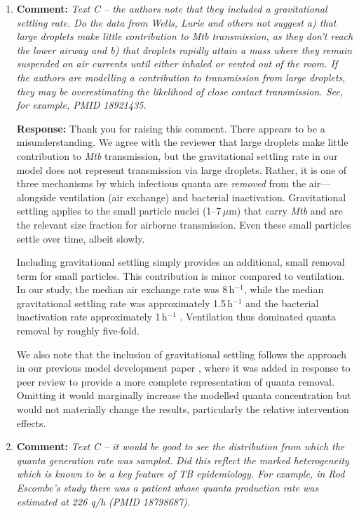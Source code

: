 \documentclass[11pt]{article}
\newcommand{\comment}[1]{\textbf{Comment:} \textit{#1}}
\newcommand{\response}[1]{\textbf{Response:} #1}
\begin{document}
\begin{enumerate}[label=\textbf{R2.\arabic*.}, leftmargin=*]
\item\label{r:2.22} \comment{Text C -- the authors note that they included a gravitational settling rate. Do the data from Wells, Lurie and others not suggest a) that large droplets make little contribution to Mtb transmission, as they don't reach the lower airway and b) that droplets rapidly attain a mass where they remain suspended on air currents until either inhaled or vented out of the room. If the authors are modelling a contribution to transmission from large droplets, they may be overestimating the likelihood of close contact transmission. See, for example, PMID 18921435.}

\response{Thank you for raising this comment. There appears to be a misunderstanding. We agree with the reviewer that large droplets make little contribution to \emph{Mtb} transmission, but the gravitational settling rate in our model does not represent transmission via large droplets. Rather, it is one of three mechanisms by which infectious quanta are \textit{removed} from the air---alongside ventilation (air exchange) and bacterial inactivation. Gravitational settling applies to the small particle nuclei (1--7\,$\mu$m) that carry \emph{Mtb} and are the relevant size fraction for airborne transmission. Even these small particles settle over time, albeit slowly. 

Including gravitational settling simply provides an additional, small removal term for small particles. This contribution is minor compared to ventilation. In our study, the median air exchange rate was 8\,h$^{-1}$, while the median gravitational settling rate was approximately 1.5\,h$^{-1}$ and the bacterial inactivation rate approximately 1\,h$^{-1}$ \citep{banholzer2025PLOSComputBiol}. Ventilation thus dominated quanta removal by roughly five-fold. 

We also note that the inclusion of gravitational settling follows the approach in our previous model development paper \citep{banholzer2025PLOSComputBiol}, where it was added in response to peer review to provide a more complete representation of quanta removal. Omitting it would marginally increase the modelled quanta concentration but would not materially change the results, particularly the relative intervention effects.}

\item\label{r:2.23} \comment{Text C -- it would be good to see the distribution from which the quanta generation rate was sampled. Did this reflect the marked heterogeneity which is known to be a key feature of TB epidemiology. For example, in Rod Escombe's study there was a patient whose quanta production rate was estimated at 226 q/h (PMID 18798687).}


\end{enumerate}
\end{document}

